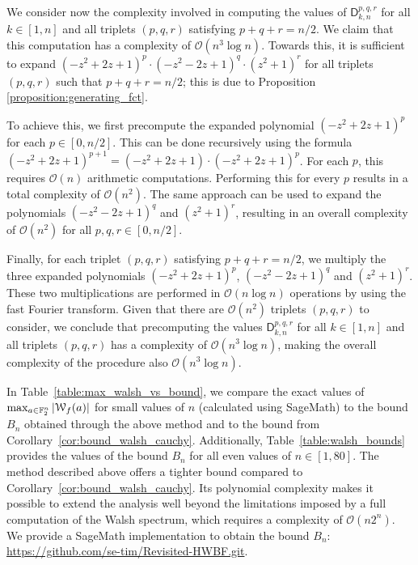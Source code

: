 \documentclass[11pt]{llncs}
\begin{document}
We consider now the complexity involved in computing the values of $\mathsf{D}_{k,n}^{p,q,r}$ for all $k\in[1,n]$ and all triplets $(p,q,r)$ satisfying $p+q+r=n/2$. We claim that this computation has a complexity of $\mathcal{O}(n^3 \log n)$. Towards this, it is sufficient to expand $(-z^2 + 2z + 1)^p \cdot (-z^2 - 2z + 1)^q \cdot (z^2 + 1)^r$ for all triplets $(p,q,r)$ such that $p+q+r=n/2$; this is due to Proposition \ref{proposition:generating_fct}.

To achieve this, we first precompute the expanded polynomial $(-z^2 + 2z + 1)^p$ for each $p\in[0,n/2]$. This can be done recursively using the formula $(-z^2 + 2z + 1)^{p+1} = (-z^2 + 2z + 1) \cdot (-z^2 + 2z + 1)^p$. For each $p$, this requires $\mathcal O(n)$ arithmetic computations. Performing this for every $p$ results in a total complexity of $\mathcal{O}(n^2)$. The same approach can be used to expand the polynomials $(-z^2 - 2z + 1)^q$ and $(z^2 + 1)^r$, resulting in an overall complexity of $\mathcal{O}(n^2)$ for all $p,q,r\in[0,n/2]$. 

Finally, for each triplet $(p,q,r)$ satisfying $p+q+r=n/2$, we multiply the three expanded polynomials $(-z^2 + 2z + 1)^p$, $(-z^2 - 2z + 1)^q$ and $(z^2 + 1)^r$. These two multiplications are performed in $\mathcal{O}(n \log n)$ operations by using the fast Fourier transform. Given that there are $\mathcal{O}(n^2)$ triplets $(p,q,r)$ to consider, we conclude that precomputing the values $\mathsf{D}_{k,n}^{p,q,r}$ for all $k\in[1,n]$ and all triplets $(p,q,r)$ has a complexity of $\mathcal{O}(n^3 \log n)$, making the overall complexity of the procedure also $\mathcal{O}(n^3 \log n)$.

\bigskip

In Table~\ref{table:max_walsh_vs_bound}, we compare the exact values of $\max_{a\in\mathbb F_2^n}|\mathcal W_{f}(a)|$ for small values of $n$ (calculated using \textsf{SageMath}) to the bound $B_n$ obtained through the above method and to the bound from Corollary~\ref{cor:bound_walsh_cauchy}. Additionally, Table~\ref{table:walsh_bounds} provides the values of the bound $B_n$ for all even values of $n\in[1,80]$. The method described above offers a tighter bound compared to Corollary~\ref{cor:bound_walsh_cauchy}. Its polynomial complexity makes it possible to extend the analysis well beyond the limitations imposed by a full computation of the Walsh spectrum, which requires a complexity of $\mathcal O(n2^n)$.
\ifnum{}
	We provide a \textsf{SageMath} implementation to obtain the bound $B_n$: \url{https://github.com/se-tim/Revisited-HWBF.git}.
\fi
\end{document}
